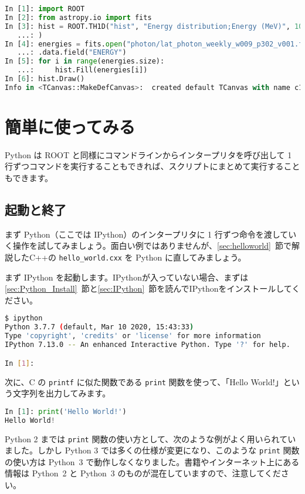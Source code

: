 \begin{lstlisting}[language=python]
In [1]: import ROOT
In [2]: from astropy.io import fits 
In [3]: hist = ROOT.TH1D("hist", "Energy distribution;Energy (MeV)", 100, 0, 1e3
   ...: )
In [4]: energies = fits.open("photon/lat_photon_weekly_w009_p302_v001.fits")[1]
   ...: .data.field("ENERGY")
In [5]: for i in range(energies.size):
   ...:     hist.Fill(energies[i])
In [6]: hist.Draw()
Info in <TCanvas::MakeDefCanvas>:  created default TCanvas with name c1
\end{lstlisting}

\section{簡単に使ってみる}
Python は ROOT と同様にコマンドラインからインタープリタを呼び出して 1 行ずつコマンドを実行することもできれば、スクリプトにまとめて実行することもできます。

\subsection{起動と終了}
まず Python（ここでは IPython）のインタープリタに 1 行ずつ命令を渡していく操作を試してみましょう。面白い例ではありませんが、\ref{sec:helloworld}~節で解説したC++の \texttt{hello\_world.cxx} を Python に直してみましょう。

まず IPython を起動します。IPythonが入っていない場合、まずは\ref{sec:Python_Install}~節と\ref{sec:IPython}~節を読んでIPythonをインストールしてください。

\begin{lstlisting}[language=bash]
$ ipython
Python 3.7.7 (default, Mar 10 2020, 15:43:33) 
Type 'copyright', 'credits' or 'license' for more information
IPython 7.13.0 -- An enhanced Interactive Python. Type '?' for help.

In [1]: 
\end{lstlisting}

次に、C の \texttt{printf} に似た関数である \texttt{print} 関数を使って、「Hello World!」という文字列を出力してみます。
\begin{lstlisting}[language=python]
In [1]: print('Hello World!')
Hello World!
\end{lstlisting}

Python 2 までは \texttt{print} 関数の使い方として、次のような例がよく用いられていました。しかし Python 3 では多くの仕様が変更になり、このような \texttt{print} 関数の使い方は Python~3 で動作しなくなりました。書籍やインターネット上にある情報は Python~2 と Python~3 のものが混在していますので、注意してください。

